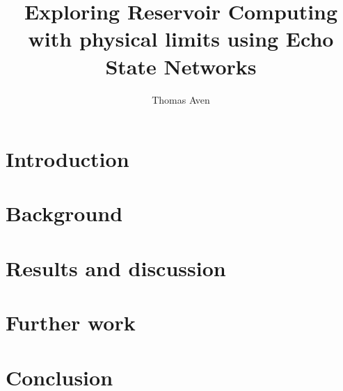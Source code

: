 \documentclass[journal]{IEEEtran}
\begin{document}
\title{Exploring Reservoir Computing with physical limits using Echo State Networks}
\author{Thomas Aven}
\date{}
\maketitle



\section{Introduction}


\section{Background}


\section{Results and discussion}


\section{Further work}


\section{Conclusion}





\end{document}
